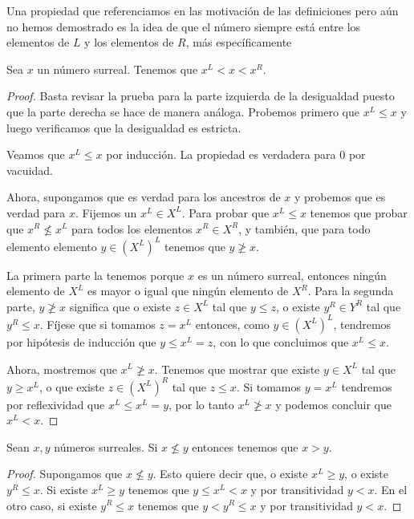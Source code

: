     Una propiedad que referenciamos en las motivaci\'on de las definiciones pero a\'un no hemos demostrado es la idea de que el n\'umero siempre est\'a entre los elementos de $L$ y los elementos de $R$, m\'as espec\'ificamente

    \begin{theorem}
        Sea $x$ un n\'umero surreal. Tenemos que $x^L < x < x^R$.
    \end{theorem}

    \begin{proof}
        Basta revisar la prueba para la parte izquierda de la desigualdad puesto que la parte derecha se hace de manera an\'aloga. Probemos primero que $x^L \le x$ y luego verificamos que la desigualdad es estricta.

        Veamos que $x^L \le x$ por inducci\'on. La propiedad es verdadera para $0$ por vacuidad. 
        
        Ahora, supongamos que es verdad para los ancestros de $x$ y probemos que es verdad para $x$. Fijemos un $x^L\in X^L$. Para probar que $x^L\le x$ tenemos que probar que $x^R \not\le x^L$ para todos los elementos $x^R\in X^R$, y tambi\'en, que para todo elemento elemento $y\in (X^L)^L$ tenemos que $y \not\ge x$.
        
        La primera parte la tenemos porque $x$ es un n\'umero surreal, entonces ning\'un elemento de $X^L$ es mayor o igual que ning\'un elemento de $X^R$. Para la segunda parte, $y \not\ge x$ significa que o existe $z\in X^L$ tal que $y\le z$, o existe $y^R\in Y^R$ tal que $y^R\le x$. F\'ijese que si tomamos $z = x^L$ entonces, como $y\in (X^L)^L$, tendremos por hip\'otesis de inducci\'on que $y\le x^L = z$, con lo que concluimos que $x^L\le x$.

        Ahora, mostremos que $x^L \not\ge x$. Tenemos que mostrar que existe $y\in X^L$ tal que $y\ge x^L$, o que existe $z\in (X^L)^R$ tal que $z\le x$. Si tomamos $y=x^L$ tendremos por reflexividad que $x^L\le x^L = y$, por lo tanto $x^L\not\ge x$ y podemos concluir que $x^L < x$.
    \end{proof}

    \begin{corollary}
        Sean $x, y$ n\'umeros surreales. Si $x \not\le y$ entonces tenemos que $x > y$. 
    \end{corollary}

    \begin{proof}
        Supongamos que $x\not\le y$. Esto quiere decir que, o existe $x^L \ge y$, o existe $y^R \le x$. Si existe $x^L \ge y$ tenemos que $y \le x^L < x$ y por transitividad $y < x$. En el otro caso, si existe $y^R \le x$ tenemos que $y < y^R \le x$ y por transitividad $y < x$.
    \end{proof}


